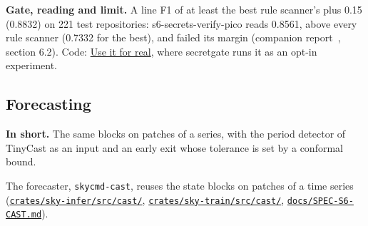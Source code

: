 \documentclass[10pt]{article}
\begin{document}
\textbf{Gate, reading and limit.} A line F1 of at least the best rule scanner's plus 0.15 (0.8832) on 221 test repositories: s6-secrets-verify-pico reads 0.8561, above every rule scanner (0.7332 for the best), and failed its margin (companion report~\cite{golfier2026skycmd}, section 6.2). Code: \href{https://maxgfr.github.io/skycmd/use/\#secrets}{Use it for real}, where secretgate runs it as an opt-in experiment.

\subsection{Forecasting}\label{sec:6.4}

\textbf{In short.} The same blocks on patches of a series, with the period detector of TinyCast as an input and an early exit whose tolerance is set by a conformal bound.

The forecaster, \texttt{skycmd-cast}, reuses the state blocks on patches of a time series (\href{https://github.com/maxgfr/skycmd/tree/main/crates/sky-infer/src/cast}{\texttt{crates/\allowbreak{}sky-infer/\allowbreak{}src/\allowbreak{}cast/\allowbreak{}}}, \href{https://github.com/maxgfr/skycmd/tree/main/crates/sky-train/src/cast}{\texttt{crates/\allowbreak{}sky-train/\allowbreak{}src/\allowbreak{}cast/\allowbreak{}}}, \href{https://github.com/maxgfr/skycmd/blob/main/docs/SPEC-S6-CAST.md}{\texttt{docs/\allowbreak{}SPEC-S6-CAST.md}}).
\end{document}
